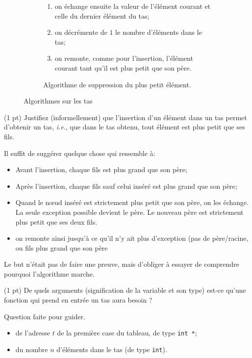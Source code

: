 \begin{figure}
\begin{subfigure}[t]{0.45\textwidth}
{{\begin{enumerate}
          {\'e}l{\'e}ments, et l'{\'e}l{\'e}ment courant devient l'indice du fils gauche;
        \item on {\'e}change ensuite la valeur de l'{\'e}l{\'e}ment courant et celle
          du dernier {\'e}l{\'e}ment du tas;
        \item on d{\'e}cr{\'e}mente de $1$ le nombre d'{\'e}l{\'e}ments dans le tas;
        \item on remonte, comme pour l'insertion, l'{\'e}l{\'e}ment courant tant
          qu'il est plus petit que son p{\`e}re.  
        \end{enumerate}}\quad}
    \caption{Algorithme de suppression du plus petit {\'e}l{\'e}ment.}
    \label{fig:tas:suppression}
  \end{subfigure}
  \label{fig:tas:algos}
  \caption{Algorithmes sur les tas}
\end{figure}

\question (1 pt) Justifiez (informellement) que l'insertion d'un
{\'e}l{\'e}ment dans un tas permet d'obtenir un tas, \textit{i.e.}, que dans
le tas obtenu, tout {\'e}l{\'e}ment est plus petit que ses fils.

\begin{solution}
  Il suffit de suggérer quelque chose qui ressemble à:
  \begin{itemize}
  \item Avant l'insertion, chaque fils est plus grand que son père;
  \item Après l'insertion, chaque fils sauf celui inséré est plus grand que son père;
  \item Quand le n\oe ud inséré est strictement plus petit que son
    père, on les échange. La seule exception possible devient le
    père. Le nouveau père est strictement plus petit que ses deux fils.
  \item on remonte ainsi jusqu'à ce qu'il n'y ait plus d'exception
    (pas de père/racine, ou fils plus grand que son père
  \end{itemize}
  Le but n'était pas de faire une preuve, mais d'obliger à essayer de
  comprendre pourquoi l'algorithme marche.
\end{solution}

\question (1 pt) De quels arguments (signification de la variable et
son type) est-ce qu'une fonction qui prend en entrée un tas aura
besoin ?

\begin{solution}
  Question faite pour guider. 
  \begin{itemize}
  \item de l'adresse \(t\) de la première case du tableau, de type \texttt{int *};
  \item du nombre \(n\) d'éléments dans le tas (de type \texttt{int}).
  \end{itemize}
\end{solution}

